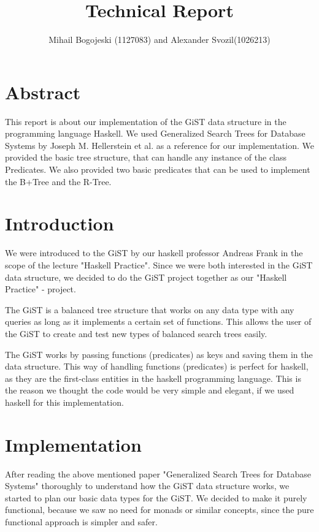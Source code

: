 \documentclass{scrartcl}
\title{Technical Report}
\author{Mihail Bogojeski (1127083) and Alexander Svozil(1026213)}
\date{}
\begin{document}
\maketitle
\tableofcontents
\newpage
 \section {Abstract}
    This report is about our implementation of the GiST data structure in the programming language Haskell.
    We used  Generalized Search Trees for Database Systems by Joseph M. Hellerstein et al. \cite{Hellerstein95generalizedsearch}
     as a reference for our implementation. We provided the basic tree structure, that can handle any 
    instance of the class Predicates. We also provided two basic predicates that can be used to implement the B+Tree and
    the R-Tree.
\newpage

 \section{Introduction}
 We were introduced to the GiST by our haskell professor Andreas Frank in the scope of the lecture "Haskell Practice". 
 Since we were both interested in the GiST data structure, we decided to do the GiST project together as our "Haskell Practice" - project.
 
 The GiST is a balanced tree structure that works on any data type with any queries as long as it implements
 a certain set of functions. This allows the user of the GiST to create and test new types of balanced search trees easily.

 The GiST works by passing functions (predicates) as keys and saving them in the data structure.
 This way of handling functions (predicates) is perfect for haskell, as they are the first-class entities in the haskell programming language.
 This is the reason we thought the code would be very simple and elegant, if we used haskell for this implementation.

 \section{Implementation}

 After reading the above mentioned paper "Generalized Search Trees for Database Systems" \cite{Hellerstein95generalizedsearch} thoroughly to understand how the GiST data structure works, we started to plan our basic
 data types for the GiST. We decided to make it purely functional, because we saw no need for monads or similar concepts, since the pure functional approach is simpler and safer.
 
\end{document}
